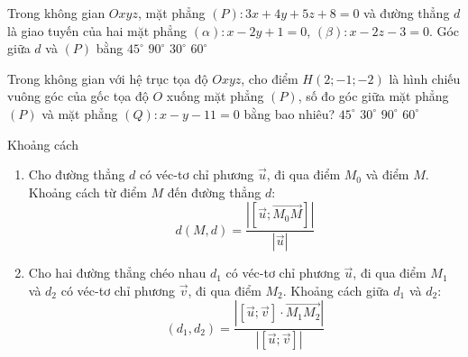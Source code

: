 	\begin{ex}%
	Trong không gian $Oxyz$, mặt phẳng $(P) \colon 3x+4y+5z+8=0$ và đường thẳng $d$ là giao tuyến của hai mặt phẳng $(\alpha) \colon x-2y+1=0$, $(\beta) \colon x-2z-3=0$. Góc giữa $d$ và $(P)$ bằng
	\choice
	{$45^\circ$}
	{$90^\circ$}
	{$30^\circ$}
	{\True $60^\circ$}
	\end{ex}
	\begin{ex}%
	Trong không gian với hệ trục tọa độ $Oxyz$, cho điểm $H(2;-1;-2)$ là hình chiếu vuông góc của gốc tọa độ $O$ xuống mặt phẳng $(P)$, số đo góc giữa mặt phẳng $(P)$ và mặt phẳng $(Q)\colon x-y-11=0$ bằng bao nhiêu?
	\choice
	{\True $45^\circ$}
	{$30^\circ$}
	{$90^\circ$}
	{$60^\circ$}
	\end{ex}
	\begin{dang}{Khoảng cách}%
	\begin{enumerate}
	\item Cho đường thẳng $d$ có véc-tơ chỉ phương $\vec{u}$, đi qua điểm $M_0$ và điểm $ M $. Khoảng cách từ điểm $ M $ đến đường thẳng $ d $:
	$$ d\left(M,d\right)=\dfrac{|\left[\vec{u};\vec{M_0M}\right]|}{|\vec{u}|}$$
	\item Cho hai đường thẳng chéo nhau $d_1$ có véc-tơ chỉ phương $\vec{u}$, đi qua điểm $M_1 $ và $d_2$ có véc-tơ chỉ phương $\vec{v}$, đi qua điểm $M_2$. Khoảng cách giữa $ d_1 $ và $ d_2 $:
	$$\left(d_1,d_2\right)=\dfrac{\left|\left[\vec{u};\vec{v}\right]\cdot\vec{M_1M_2}\right|}{|\left[\vec{u};\vec{v}\right]|}$$
	\end{enumerate}
\end{dang}
\setcounter{subsubsection}{0}
\setcounter{vd}{0}
\setcounter{ex}{0}
